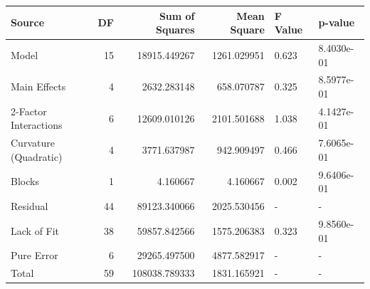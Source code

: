 \begin{tabular}{lrrrll}
\toprule
Source & DF & Sum of Squares & Mean Square & F Value & p-value \\
\midrule
Model & 15 & 18915.449267 & 1261.029951 & 0.623 & 8.4030e-01 \\
  Main Effects & 4 & 2632.283148 & 658.070787 & 0.325 & 8.5977e-01 \\
  2-Factor Interactions & 6 & 12609.010126 & 2101.501688 & 1.038 & 4.1427e-01 \\
  Curvature (Quadratic) & 4 & 3771.637987 & 942.909497 & 0.466 & 7.6065e-01 \\
  Blocks & 1 & 4.160667 & 4.160667 & 0.002 & 9.6406e-01 \\
Residual & 44 & 89123.340066 & 2025.530456 & - & - \\
  Lack of Fit & 38 & 59857.842566 & 1575.206383 & 0.323 & 9.8560e-01 \\
  Pure Error & 6 & 29265.497500 & 4877.582917 & - & - \\
Total & 59 & 108038.789333 & 1831.165921 & - & - \\
\bottomrule
\end{tabular}

